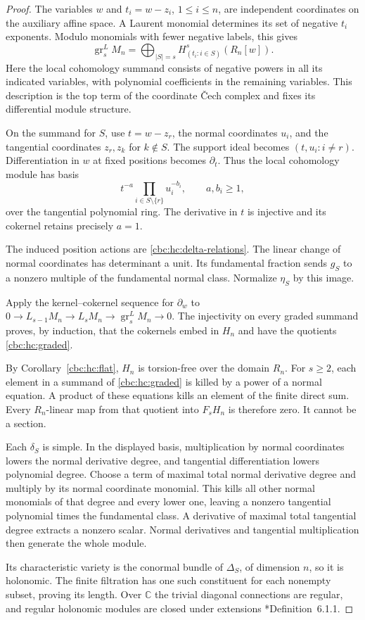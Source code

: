 \begin{proof}
The variables $w$ and $t_i=w-z_i$, $1\leq i\leq n$, are
independent coordinates on the auxiliary affine space.
A Laurent monomial determines its set of negative $t_i$
exponents. Modulo monomials with fewer negative labels, this
gives
\[
 \operatorname{gr}_s^L M_n
 =\bigoplus_{|S|=s}H^s_{(t_i:i\in S)}(R_n[w]).
\]
Here the local cohomology summand consists of negative powers
in all its indicated variables, with polynomial coefficients
in the remaining variables. This description is the top term
of the coordinate \v Cech complex and fixes its differential
module structure.

On the summand for $S$, use $t=w-z_r$, the normal coordinates
$u_i$, and the tangential coordinates $z_r,z_k$ for $k\notin S$.
The support ideal becomes $(t,u_i:i\ne r)$.
Differentiation in $w$ at fixed positions becomes $\partial_t$.
Thus the local cohomology module has basis
\[
 t^{-a}\prod_{i\in S\setminus\{r\}}u_i^{-b_i},
 \qquad a,b_i\geq1,
\]
over the tangential polynomial ring. The derivative in $t$ is
injective and its cokernel retains precisely $a=1$.

The induced position actions are \eqref{cbc:hc:delta-relations}.
The linear change of normal coordinates has determinant a
unit. Its fundamental fraction sends $g_S$ to a nonzero
multiple of the fundamental normal class. Normalize $\eta_S$
by this image.

Apply the kernel--cokernel sequence for $\partial_w$ to
$0\to L_{s-1}M_n\to L_sM_n\to\operatorname{gr}_s^LM_n\to0$.
The injectivity on every graded summand proves, by induction,
that the cokernels embed in $H_n$ and have the quotients
\eqref{cbc:hc:graded}.

By Corollary~\ref{cbc:hc:flat}, $H_n$ is torsion-free over the
domain $R_n$. For $s\geq2$, each element in a summand of
\eqref{cbc:hc:graded} is killed by a power of a normal equation.
A product of these equations kills an element of the finite
direct sum. Every $R_n$-linear map from that
quotient into $F_sH_n$ is therefore zero. It cannot be a section.

Each $\delta_S$ is simple. In the displayed basis, multiplication
by normal coordinates lowers the normal derivative degree,
and tangential differentiation lowers polynomial degree.
Choose a term of maximal total normal derivative degree and
multiply by its normal coordinate monomial. This kills all
other normal monomials of that degree and every lower one,
leaving a nonzero tangential polynomial times the fundamental
class. A derivative of maximal total tangential degree
extracts a nonzero scalar. Normal derivatives and tangential
multiplication then generate the whole module.

Its characteristic variety is the conormal
bundle of $\Delta_S$, of dimension $n$, so it is holonomic.
The finite filtration has one such constituent for each
nonempty subset, proving its length. Over $\mathbb C$ the
trivial diagonal connections are regular, and regular
holonomic modules are closed under extensions
\cite{HottaTakeuchiTanisaki2008}*{Definition~6.1.1}.
\end{proof}

